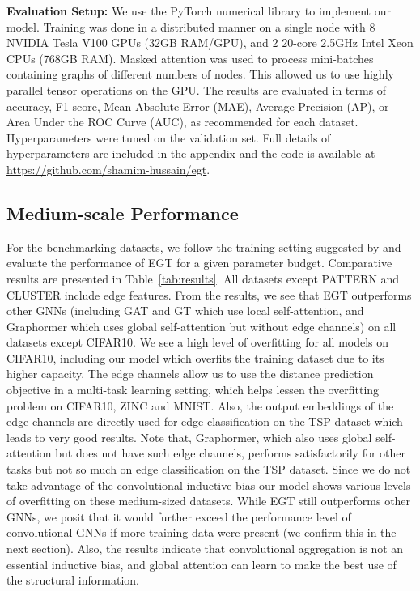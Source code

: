 \documentclass[sigconf,authorversion]{acmart}
\begin{document}
\noindent\textbf{Evaluation Setup:} We use the PyTorch \cite{paszke2019pytorch} numerical library to implement our model. Training was done in a distributed manner on a single node with 8 NVIDIA Tesla V100 GPUs (32GB RAM/GPU), and 2 20-core 2.5GHz Intel Xeon CPUs (768GB RAM). Masked attention was used to process mini-batches containing graphs of different numbers of nodes. This allowed us to use highly parallel tensor operations on the GPU. The results are evaluated in terms of accuracy, F1 score, Mean Absolute Error (MAE), Average Precision (AP), or Area Under the ROC Curve (AUC), as recommended for each dataset. Hyperparameters were tuned on the validation set. Full details of hyperparameters are included in the appendix and the code is available at \url{https://github.com/shamim-hussain/egt}.

\subsection{Medium-scale Performance}
For the benchmarking datasets, we follow the training setting suggested by \citet{dwivedi2020benchmarking} and evaluate the performance of EGT for a given parameter budget. Comparative results are presented in Table~\ref{tab:results}. All datasets except PATTERN and CLUSTER include edge features. From the results, we see that EGT outperforms other GNNs (including GAT and GT which use local self-attention, and Graphormer which uses global self-attention but without edge channels) on all datasets except CIFAR10. We see a high level of overfitting for all models on CIFAR10, including our model which overfits the training dataset due to its higher capacity. The edge channels allow us to use the distance prediction objective in a multi-task learning setting, which helps lessen the overfitting problem on CIFAR10, ZINC and MNIST. Also, the output embeddings of the edge channels are directly used for edge classification on the TSP dataset which leads to very good results. Note that, Graphormer, which also uses global self-attention but does not have such edge channels, performs satisfactorily for other tasks but not so much on edge classification on the TSP dataset. Since we do not take advantage of the convolutional inductive bias our model shows various levels of overfitting on these medium-sized datasets. While EGT still outperforms other GNNs, we posit that it would further exceed the performance level of convolutional GNNs if more training data were present (we confirm this in the next section). Also, the results indicate that convolutional aggregation is not an essential inductive bias, and global attention can learn to make the best use of the structural information.
\end{document}
